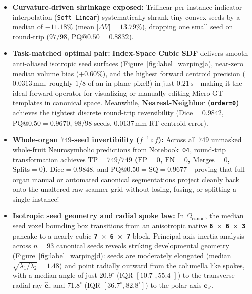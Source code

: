 \documentclass[10pt,a4paper]{article}
\renewcommand{\_}{\origunderscore\allowbreak}
\begin{document}
\begin{itemize}
    \item \textbf{Curvature-driven shrinkage exposed:} Trilinear per-instance indicator interpolation (\texttt{Soft-Linear}) systematically shrank tiny convex seeds by a median of \textbf{$-11.18\%$} (mean $|\Delta V| = 13.79\%$), dropping one small seed on round-trip ($97/98$, $\text{PQ@0.50} = 0.8832$).
    \item \textbf{Task-matched optimal pair:} \textbf{Index-Space Cubic SDF} delivers smooth anti-aliased isotropic seed surfaces (Figure~\ref{fig:label_warping}a), near-zero median volume bias ($+0.60\%$), and the highest forward centroid precision ($0.0313\,\text{mm}$, roughly $1/8$ of an in-plane pixel!) in just $0.21\,\text{s}$---making it the ideal forward operator for visualizing or manually editing Micro-GT templates in canonical space. Meanwhile, \textbf{Nearest-Neighbor (\texttt{order=0})} achieves the tightest discrete round-trip reversibility ($\text{Dice} = 0.9842$, $\text{PQ@0.50} = 0.9670$, $98/98$ seeds, $0.0137\,\text{mm}$ RT centroid error).
    \item \textbf{Whole-organ $749$-seed invertibility ($f^{-1}\circ f$):} Across all $749$ unmasked whole-fruit Neurosymbolic predictions from Notebook~\texttt{04}, round-trip transformation achieves \textbf{$\text{TP} = 749/749$ ($\text{FP}=0$, $\text{FN}=0$, $\text{Merges}=0$, $\text{Splits}=0$)}, $\text{Dice} = 0.9848$, and $\text{PQ@0.50} = \text{SQ} = 0.9677$---proving that full-organ manual or automated canonical segmentations project cleanly back onto the unaltered raw scanner grid without losing, fusing, or splitting a single instance!
    \item \textbf{Isotropic seed geometry and radial spoke law:} In $\Omega_{\text{canon}}$, the median seed voxel bounding box transitions from an anisotropic native \textbf{\texttt{6 $\times$ 6 $\times$ 3}} pancake to a nearly cubic \textbf{\texttt{7 $\times$ 6 $\times$ 7}} block. Principal-axis inertia analysis across $n=93$ canonical seeds reveals striking developmental geometry (Figure~\ref{fig:label_warping}d): seeds are moderately elongated (median $\sqrt{\lambda_1/\lambda_2} = 1.48$) and point radially outward from the columella like spokes, with a median angle of just \textbf{$20.9^\circ$} (IQR $[10.7^\circ, 55.4^\circ]$) to the transverse radial ray $\hat{\mathbf{e}}_r$ and \textbf{$71.8^\circ$} (IQR $[36.7^\circ, 82.8^\circ]$) to the polar axis $\hat{\mathbf{e}}_{z'}$.
\end{itemize}
\end{document}
